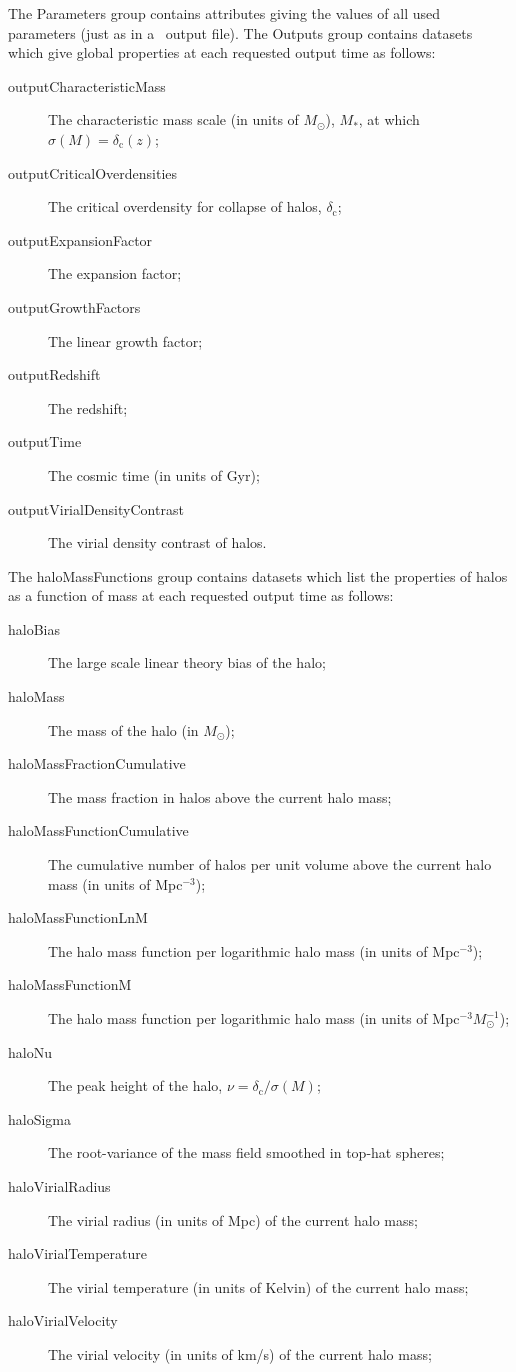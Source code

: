 The {\normalfont \ttfamily Parameters} group contains attributes giving the values of all used parameters (just as in a \glc\ output file). The {\normalfont \ttfamily Outputs} group contains datasets which give global properties at each requested output time as follows:
\begin{description}
\item [{\normalfont \ttfamily outputCharacteristicMass}] The characteristic mass scale (in units of $M_\odot$), $M_*$, at which $\sigma(M)=\delta_{\mathrm c}(z)$;
\item [{\normalfont \ttfamily outputCriticalOverdensities}] The critical overdensity for collapse of halos, $\delta_{\mathrm c}$;
\item [{\normalfont \ttfamily outputExpansionFactor}] The expansion factor;
\item [{\normalfont \ttfamily outputGrowthFactors}] The linear growth factor;
\item [{\normalfont \ttfamily outputRedshift}] The redshift;
\item [{\normalfont \ttfamily outputTime}] The cosmic time (in units of Gyr);
\item [{\normalfont \ttfamily outputVirialDensityContrast}] The virial density contrast of halos.
\end{description}
The {\normalfont \ttfamily haloMassFunctions} group contains datasets which list the properties of halos as a function of mass at each requested output time as follows:
\begin{description}
\item [{\normalfont \ttfamily haloBias}] The large scale linear theory bias of the halo;
\item [{\normalfont \ttfamily haloMass}] The mass of the halo (in $M_\odot$);
\item [{\normalfont \ttfamily haloMassFractionCumulative}] The mass fraction in halos above the current halo mass;
\item [{\normalfont \ttfamily haloMassFunctionCumulative}] The cumulative number of halos per unit volume above the current halo mass (in units of Mpc$^{-3}$);
\item [{\normalfont \ttfamily haloMassFunctionLnM}] The halo mass function per logarithmic halo mass (in units of Mpc$^{-3}$);
\item [{\normalfont \ttfamily haloMassFunctionM}] The halo mass function per logarithmic halo mass (in units of Mpc$^{-3} M_\odot^{-1}$);
\item [{\normalfont \ttfamily haloNu}] The peak height of the halo, $\nu = \delta_{\mathrm c}/\sigma(M)$;
\item [{\normalfont \ttfamily haloSigma}] The root-variance of the mass field smoothed in top-hat spheres;
\item [{\normalfont \ttfamily haloVirialRadius}] The virial radius (in units of Mpc) of the current halo mass;
\item [{\normalfont \ttfamily haloVirialTemperature}] The virial temperature (in units of Kelvin) of the current halo mass;
\item [{\normalfont \ttfamily haloVirialVelocity}] The virial velocity (in units of km/s) of the current halo mass;
\end{description}
